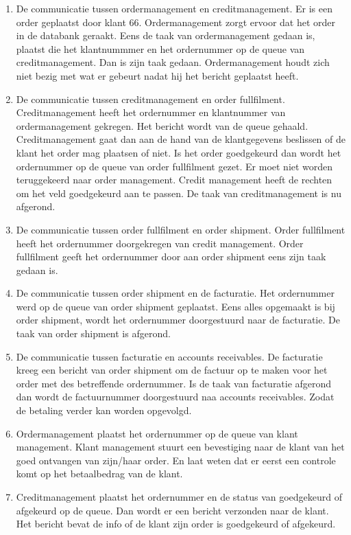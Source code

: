 \begin{enumerate}
	\item De communicatie tussen ordermanagement en creditmanagement. Er is een order geplaatst door klant 66. Ordermanagement zorgt ervoor dat het order in de databank geraakt. Eens de taak van ordermanagement gedaan is, plaatst die het klantnummmer en het ordernummer op de queue van creditmanagement. Dan is zijn taak gedaan. Ordermanagement houdt zich niet bezig met wat er gebeurt nadat hij het bericht geplaatst heeft.
	\item De communicatie tussen creditmanagement en order fullfilment. Creditmanagement heeft het ordernummer en klantnummer van ordermanagement gekregen. Het bericht wordt van de queue gehaald. Creditmanagement gaat dan aan de hand van de klantgegevens beslissen of de klant het order mag plaatsen of niet. Is het order goedgekeurd dan wordt het ordernummer op de queue van order fullfilment gezet. Er moet niet worden teruggekeerd naar order management. Credit management heeft de rechten om het veld goedgekeurd aan te passen. De taak van creditmanagement is nu afgerond.
	\item De communicatie tussen order fullfilment en order shipment. Order fullfilment heeft het ordernummer doorgekregen van credit management. Order fullfilment geeft het ordernummer door aan order shipment eens zijn taak gedaan is. 
	\item De communicatie tussen order shipment en de facturatie. Het ordernummer werd op de queue van order shipment geplaatst. Eens alles opgemaakt is bij order shipment, wordt het ordernummer doorgestuurd naar de facturatie. De taak van order shipment is afgerond.
	\item De communicatie tussen facturatie en accounts receivables. De facturatie kreeg een bericht van order shipment om de factuur op te maken voor het order met des betreffende ordernummer. Is de taak van facturatie afgerond dan wordt de factuurnummer doorgestuurd naa accounts receivables. Zodat de betaling verder kan worden opgevolgd.
	\item Ordermanagement plaatst het ordernummer op de queue van klant management. Klant management stuurt een bevestiging naar de klant van het goed ontvangen van zijn/haar order. En laat weten dat er eerst een controle komt op het betaalbedrag van de klant.
	\item Creditmanagement plaatst het ordernummer en de status van goedgekeurd of afgekeurd op de queue. Dan wordt er een bericht verzonden naar de klant. Het bericht bevat de info of de klant zijn order is goedgekeurd of afgekeurd.

\end{enumerate}
